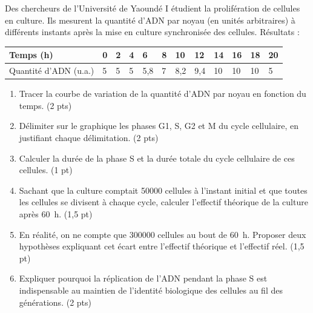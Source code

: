 \documentclass[11pt]{article}
\begin{document}
\begin{exercice}
Des chercheurs de l'Université de Yaoundé I étudient la prolifération de cellules en culture. Ils mesurent la quantité d'ADN par noyau (en unités arbitraires) à différents instants après la mise en culture synchronisée des cellules. Résultats :
\begin{center}
\begin{tabularx}{\linewidth}{|l|X|X|X|X|X|X|X|X|X|X|X|}
\hline
\rowcolor{popblueL} Temps (h) & 0 & 2 & 4 & 6 & 8 & 10 & 12 & 14 & 16 & 18 & 20 \\
\hline
Quantité d'ADN (u.a.) & 5 & 5 & 5 & 5,8 & 7 & 8,2 & 9,4 & 10 & 10 & 10 & 5 \\
\hline
\end{tabularx}
\end{center}
\begin{enumerate}
\item Tracer la courbe de variation de la quantité d'ADN par noyau en fonction du temps. \hfill (2 pts)
\item Délimiter sur le graphique les phases G1, S, G2 et M du cycle cellulaire, en justifiant chaque délimitation. \hfill (2 pts)
\item Calculer la durée de la phase S et la durée totale du cycle cellulaire de ces cellules. \hfill (1 pt)
\item Sachant que la culture comptait \num{50000} cellules à l'instant initial et que toutes les cellules se divisent à chaque cycle, calculer l'effectif théorique de la culture après \SI{60}{h}. \hfill (1,5 pt)
\item En réalité, on ne compte que \num{300000} cellules au bout de \SI{60}{h}. Proposer deux hypothèses expliquant cet écart entre l'effectif théorique et l'effectif réel. \hfill (1,5 pt)
\item Expliquer pourquoi la réplication de l'ADN pendant la phase S est indispensable au maintien de l'identité biologique des cellules au fil des générations. \hfill (2 pts)
\end{enumerate}
\end{exercice}
\end{document}
